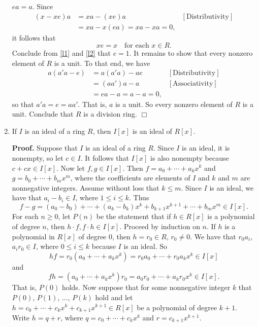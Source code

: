 \documentclass[9pt]{article}
\newcommand{\qed}{\hfill \ensuremath{\Box}}
\begin{document}
\begin{enumerate}
      $ea = a$. Since
      \begin{align*}
         (x - xe)a &= xa - (xe)a &[\text{Distributivity}] \\ 
            &= xa - x(ea) = xa - xa = 0,
      \end{align*}
      it follows that
      \begin{equation} \label{l2}
         xe = x \quad \text{for each } x \in R.
      \end{equation}
      Conclude from \eqref{l1} and \eqref{l2} that $e = 1$. It remains to show
      that every nonzero element of $R$ is a unit. To that end, we have
      \begin{align*}
         a(a'a - e) &= a(a'a) - ae &[\text{Distributivity}] \\ 
            &= (aa')a - a &[\text{Associativity}] \\
            &= ea - a = a - a = 0,
      \end{align*}
      so that $a'a = e = aa'$. That is, $a$ is a unit. So every nonzero element
      of $R$ is a unit. Conclude that $R$ is a division ring. \qed
   \item If $I$ is an ideal of a ring $R$, then $I[x]$ is an ideal of $R[x]$.
         
      \textbf{Proof.} Suppose that $I$ is an ideal of a ring $R$. Since $I$ is
      an ideal, it is nonempty, so let $c \in I$. It follows that $I[x]$ is also
      nonempty because $c + cx \in I[x]$. Now let $f, g \in I[x]$. Then
      $f = a_0 + \cdots + a_kx^k$ and $g = b_0 + \cdots + b_mx^m$, where the
      coefficients are elements of $I$ and $k$ and $m$ are nonnegative integers.
      Assume without loss that $k \le m$. Since $I$ is an ideal, we have that
      $a_i - b_i \in I$, where $1 \le i \le k$. Thus
      $$f - g = (a_0 - b_0) + \cdots + (a_k - b_k)x^k + b_{k + 1}x^{k + 1} +
        \cdots + b_mx^m \in I[x].$$
      For each $n \ge 0$, let $P(n)$ be the statement that if $h \in R[x]$ is 
      a polynomial of degree $n$, then $h \cdot f, f \cdot h \in I[x]$. Proceed
      by induction on $n$. If $h$ is a polynomial in $R[x]$ of degree 0, then
      $h = r_0 \in R$, $r_0 \neq 0$. We have
      that $r_0a_i$, $a_ir_0 \in I$, where $0 \le i \le k$ because $I$ is an
      ideal. So
      $$hf = r_0(a_0 + \cdots + a_kx^k) =  r_0a_0 + \cdots + r_0a_kx^k\in I[x]$$
      and
      $$fh = (a_0 + \cdots + a_kx^k)r_0 =  a_0r_0 + \cdots +a_kr_0x^k\in I[x].$$
      That is, $P(0)$ holds. Now suppose that for some nonnegative integer $k$
      that $P(0)$, $P(1)$, $\ldots$, $P(k)$ hold and let $h = c_0 + \cdots + 
      c_kx^k + c_{k+1}x^{k+1} \in R[x]$ be a polynomial of degree $k + 1$. Write
      $h = q + r$, where $q = c_0 + \cdots + c_kx^k$ and $r = c_{k+1}x^{k+1}$.


\end{enumerate}
\end{document}
